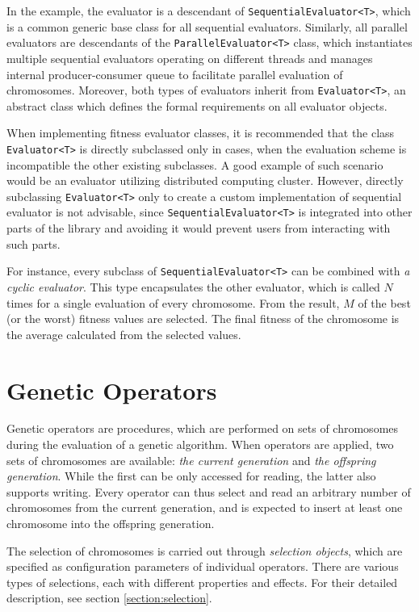 In the example, the evaluator is a descendant of \texttt{SequentialEvaluator<T>}, which is a common generic base class for all sequential evaluators. Similarly, all parallel evaluators are descendants of the \texttt{ParallelEvaluator<T>} class, which instantiates multiple sequential evaluators operating on different threads and manages internal producer-consumer queue to facilitate parallel evaluation of chromosomes. Moreover, both types of evaluators inherit from \texttt{Evaluator<T>}, an abstract class which defines the formal requirements on all evaluator objects.

When implementing fitness evaluator classes, it is recommended that the class \texttt{Evaluator<T>} is directly subclassed only in cases, when the evaluation scheme is incompatible the other existing subclasses. A good example of such scenario would be an evaluator utilizing distributed computing cluster. However, directly subclassing \texttt{Evaluator<T>} only to create a custom implementation of sequential evaluator is not advisable, since \texttt{SequentialEvaluator<T>} is integrated into other parts of the library and avoiding it would prevent users from interacting with such parts.

For instance, every subclass of \texttt{SequentialEvaluator<T>} can be combined with \textit{a cyclic evaluator}. This type encapsulates the other evaluator, which is called $N$ times for a single evaluation of every chromosome. From the result, $M$ of the best (or the worst) fitness values are selected. The final fitness of the chromosome is the average calculated from the selected values.

\section{Genetic Operators}\label{section:genetic-operators}
Genetic operators are procedures, which are performed on sets of chromosomes during the evaluation of a genetic algorithm. When operators are applied, two sets of chromosomes are available: \textit{the current generation} and \textit{the offspring generation}. While the first can be only accessed for reading, the latter also supports writing. Every operator can thus select and read an arbitrary number of chromosomes from the current generation, and is expected to insert at least one chromosome into the offspring generation.

The selection of chromosomes is carried out through \textit{selection objects}, which are specified as configuration parameters of individual operators. There are various types of selections, each with different properties and effects. For their detailed description, see section \ref{section:selection}.


